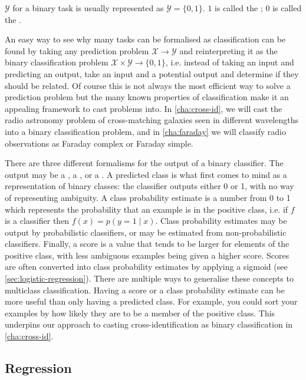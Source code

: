         $\mathcal Y$ for a binary task is usually represented as $\mathcal Y = \{0, 1\}$. $1$ is called the ; $0$ is called the .

        An easy way to see why many tasks can be formalised as classification can be found by taking any prediction problem $\mathcal X \to \mathcal Y$ and reinterpreting it as the binary classification problem $\mathcal X \times \mathcal Y \to \{0, 1\}$, i.e. instead of taking an input and predicting an output, take an input and a potential output and determine if they should be related. Of course this is not always the most efficient way to solve a prediction problem but the many known properties of classification make it an appealing framework to cast problems into. In \autoref{cha:cross-id}, we will cast the radio astronomy problem of cross-matching galaxies seen in different wavelengths into a binary classification problem, and in \autoref{cha:faraday} we will classify radio observations as Faraday complex or Faraday simple.

        There are three different formalisms for the output of a binary classifier. The output may be a , a , or a . A predicted class is what first comes to mind as a representation of binary classes: the classifier outputs either 0 or 1, with no way of representing ambiguity. A class probability estimate is a number from 0 to 1 which represents the probability that an example is in the positive class, i.e. if $f$ is a classifier then $f(x) = p(y = 1 \mid x)$. Class probability estimates may be output by probabilistic classifiers, or may be estimated from non-probabilistic classifiers. Finally, a score is a value that tends to be larger for elements of the positive class, with less ambiguous examples being given a higher score. Scores are often converted into class probability estimates by applying a sigmoid (see \autoref{sec:logistic-regression}). There are multiple ways to generalise these concepts to multiclass classification. Having a score or a class probability estimate can be more useful than only having a predicted class. For example, you could sort your examples by how likely they are to be a member of the positive class. This underpins our approach to casting cross-identification as binary classification in \autoref{cha:cross-id}.

    \subsection{Regression}
    \label{sec:regression}
 
